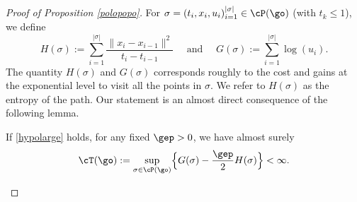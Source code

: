 \begin{proof}[Proof of Proposition \ref{polopopo}]
For $\sigma = (t_i,x_i,u_i)_{i=1}^{|\sigma|} \in \cP(\go)$
(with $t_k\leq 1$),
we define
\begin{equation}
\label{ent-ener}
H(\sigma):= \sum_{i=1}^{|\sigma|} \frac{\|x_i-x_{i-1}\|^2}{ t_i-t_{i-1} }
\quad \text{ and } \quad G(\sigma):= \sum_{i=1}^{|\sigma|} \log (u_i).
\end{equation}
The quantity $H(\sigma)$ and $G(\sigma)$ corresponds roughly to the cost and gains
at the exponential level to visit all the points in $\sigma$. We refer to $H(\sigma)$ as the entropy of the path.
Our statement is an almost direct consequence of the following lemma.
\begin{lemma}\label{entross}
If \eqref{hypolarge} holds, for any fixed $\gep>0$, we have almost surely
\begin{equation}
\cT(\go) := \sup_{\sigma\in \cP(\go)} \Bigl\{ G(\sigma) - \frac \gep 2 H(\sigma) \Bigr\} <\infty.
\end{equation}
\end{lemma}


\end{proof}
